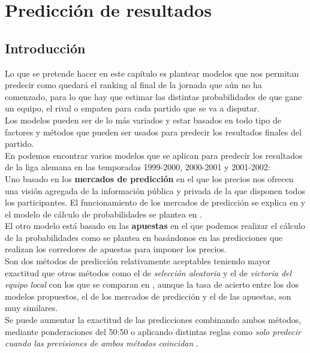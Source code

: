 \chapter{Predicción de resultados}

\section{Introducción}
Lo que se pretende hacer en este capítulo es plantear modelos que nos permitan predecir como quedará el ranking al final de la jornada que aún no ha comenzado, para lo que hay que estimar las distintas probabilidades de que gane un equipo, el rival o empaten para cada partido que se va a disputar.\\

Los modelos pueden ser de lo más variados y estar basados en todo tipo de factores y métodos que pueden ser usados para predecir los resultados finales del partido.\\

En \cite{refpred1} podemos encontrar varios modelos que se aplican para predecir los resultados de la liga alemana en las temporadas 1999-2000, 2000-2001 y 2001-2002:\\
Uno basado en los \textbf{mercados de predicción} en el que los precios nos ofrecen una visión agregada de la información pública y privada de la que disponen todos los participantes. El funcionamiento de los mercados de predicción se explica en \cite[Tabla II]{refpred1} y el modelo de cálculo de probabilidades se plantea en \cite[pág 62]{refpred1}.\\
El otro modelo está basado en las \textbf{apuestas} en el que podemos realizar el cálculo de la probabilidades como se plantea en \cite[págs 62, 63]{refpred1} basándonos en las predicciones que realizan los corredores de apuestas para imponer los precios.\\
Son dos métodos de predicción relativamente aceptables teniendo mayor exactitud que otros métodos como el de \textit{selección aleatoria} y el de \textit{victoria del equipo local} con los que se comparan en \cite[págs 64-66]{refpred1}, aunque la tasa de acierto entre los dos modelos propuestos, el de los mercados de predicción y el de las apuestas, son muy similares.\\
Se puede aumentar la exactitud de las predicciones combinando ambos métodos, mediante ponderaciones del 50:50 o aplicando distintas reglas como \textit{solo predecir cuando las previsiones de ambos métodos coincidan} \cite[págs 66-67]{refpred1}.\\

